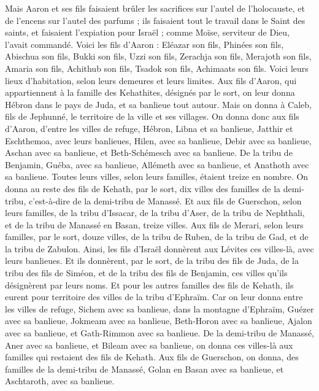 \begin{multicols}{2}
Mais Aaron et ses fils faisaient brûler les sacrifices sur l'autel de l'holocauste, et de l’encens sur l'autel des parfums ; ils faisaient tout le travail dans le Saint des saints, et faisaient l’expiation pour Israël ; comme Moïse, serviteur de Dieu, l'avait commandé.
Voici les fils d'Aaron : Eléazar son fils, Phinées son fils, Abischua son fils,
Bukki son fils, Uzzi son fils, Zerachja son fils,
Merajoth son fils, Amaria son fils, Achithub son fils,
Tsadok son fils, Achimaats son fils.
Voici leurs lieux d’habitation, selon leurs demeures et leurs limites. Aux fils d'Aaron, qui appartiennent à la famille des Kehathites, désignés par le sort,
on leur donna Hébron dans le pays de Juda, et sa banlieue tout autour.
Mais on donna à Caleb, fils de Jephunné, le territoire de la ville et ses villages.
On donna donc aux fils d'Aaron, d'entre les villes de refuge, Hébron, Libna et sa banlieue, Jatthir et Eschthemoa, avec leurs banlieues,
Hilen, avec sa banlieue, Debir avec sa banlieue,
Aschan avec sa banlieue, et Beth-Schémesch avec sa banlieue.
De la tribu de Benjamin, Guéba, avec sa banlieue, Allémeth avec sa banlieue, et Anathoth avec sa banlieue. Toutes leurs villes, selon leurs familles, étaient treize en nombre.
On donna au reste des fils de Kehath, par le sort, dix villes des familles de la demi-tribu, c'est-à-dire de la demi-tribu de Manassé.
Et aux fils de Guerschon, selon leurs familles, de la tribu d'Issacar, de la tribu d'Aser, de la tribu de Nephthali, et de la tribu de Manassé en Basan, treize villes.
Aux fils de Merari, selon leurs familles, par le sort, douze villes, de la tribu de Ruben, de la tribu de Gad, et de la tribu de Zabulon.
Ainsi, les fils d’Israël donnèrent aux Lévites ces villes-là, avec leurs banlieues.
Et ils donnèrent, par le sort, de la tribu des fils de Juda, de la tribu des fils de Siméon, et de la tribu des fils de Benjamin, ces villes qu’ils désignèrent par leurs noms.
Et pour les autres familles des fils de Kehath, ils eurent pour territoire des villes de la tribu d'Ephraïm.
Car on leur donna entre les villes de refuge, Sichem avec sa banlieue, dans la montagne d'Ephraïm, Guézer avec sa banlieue,
Jokmeam avec sa banlieue, Beth-Horon avec sa banlieue,
Ajalon avec sa banlieue, et Gath-Rimmon avec sa banlieue.
De la demi-tribu de Manassé, Aner avec sa banlieue, et Bileam avec sa banlieue, on donna ces villes-là aux familles qui restaient des fils de Kehath.
Aux fils de Guerschon, on donna, des familles de la demi-tribu de Manassé, Golan en Basan avec sa banlieue, et Aschtaroth, avec sa banlieue.

\end{multicols}
